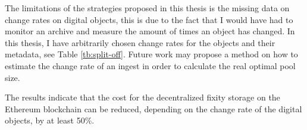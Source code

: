 The limitations of the strategies proposed in this thesis is the missing data on change rates on digital objects, this is due to the fact that I would have had to monitor an archive and measure the amount of times an object has changed. In this thesis, I have arbitrarily chosen change rates for the objects and their metadata, see Table \ref{tb:split-off}. Future work may propose a method on how to estimate the change rate of an ingest in order to calculate the real optimal pool size.

The results indicate that the cost for the decentralized fixity storage on the Ethereum blockchain can be reduced, depending on the change rate of the digital objects, by at least 50\%.